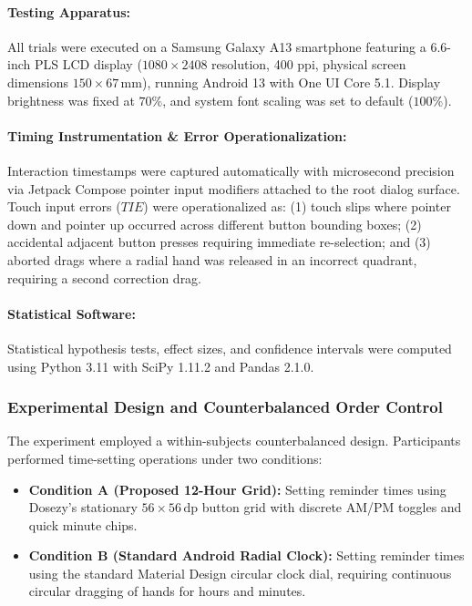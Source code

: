 \documentclass[11pt,a4paper]{article}
\begin{document}
\paragraph{Testing Apparatus:} All trials were executed on a Samsung Galaxy A13 smartphone featuring a 6.6-inch PLS LCD display ($1080 \times 2408$ resolution, 400 ppi, physical screen dimensions $150 \times 67\,\text{mm}$), running Android 13 with One UI Core 5.1. Display brightness was fixed at $70\%$, and system font scaling was set to default ($100\%$).

\paragraph{Timing Instrumentation \& Error Operationalization:} Interaction timestamps were captured automatically with microsecond precision via Jetpack Compose pointer input modifiers attached to the root dialog surface. Touch input errors ($TIE$) were operationalized as: (1) touch slips where pointer down and pointer up occurred across different button bounding boxes; (2) accidental adjacent button presses requiring immediate re-selection; and (3) aborted drags where a radial hand was released in an incorrect quadrant, requiring a second correction drag.

\paragraph{Statistical Software:} Statistical hypothesis tests, effect sizes, and confidence intervals were computed using Python 3.11 with SciPy 1.11.2 and Pandas 2.1.0.

\subsubsection{Experimental Design and Counterbalanced Order Control}
The experiment employed a within-subjects counterbalanced design. Participants performed time-setting operations under two conditions:
\begin{itemize}[leftmargin=*]
    \item \textbf{Condition A (Proposed 12-Hour Grid):} Setting reminder times using Dosezy's stationary $56\times56\,\text{dp}$ button grid with discrete AM/PM toggles and quick minute chips.
    \item \textbf{Condition B (Standard Android Radial Clock):} Setting reminder times using the standard Material Design circular clock dial, requiring continuous circular dragging of hands for hours and minutes.
\end{itemize}
\end{document}
